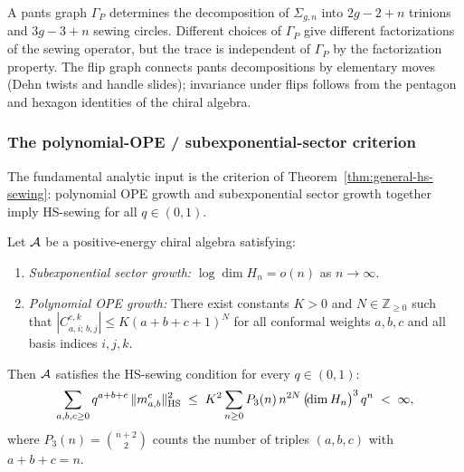 \begin{remark}
\label{rem:thqg-I-sewing-topology}
A pants graph $\Gamma_P$ determines the decomposition of $\Sigma_{g,n}$ into $2g - 2 + n$ trinions and $3g - 3 + n$ sewing circles. Different choices of $\Gamma_P$ give different factorizations of the sewing operator, but the trace is independent of $\Gamma_P$ by the factorization property. The flip graph connects pants decompositions by elementary moves (Dehn twists and handle slides); invariance under flips follows from the pentagon and hexagon identities of the chiral algebra.
\end{remark}

\subsubsection{The polynomial-OPE / subexponential-sector criterion}

The fundamental analytic input is the criterion of Theorem~\ref{thm:general-hs-sewing}: polynomial OPE growth and subexponential sector growth together imply HS-sewing for all $q \in (0,1)$.

\begin{theorem}
\label{thm:thqg-I-hs-sewing-criterion}
Let\/ $\mathcal{A}$ be a positive-energy chiral algebra satisfying:
\begin{enumerate}[label=\textup{(\alph*)}]
\item \emph{Subexponential sector growth:} $\log\dim H_n = o(n)$ as $n \to \infty$.
\item \emph{Polynomial OPE growth:} There exist constants $K > 0$ and $N \in \mathbb{Z}_{\geq 0}$ such that $|C^{c,k}_{a,i;\,b,j}| \leq K(a + b + c + 1)^N$ for all conformal weights $a,b,c$ and all basis indices $i,j,k$.
\end{enumerate}
Then $\mathcal{A}$ satisfies the HS-sewing condition for every $q \in (0,1)$:
\begin{equation}\label{eq:thqg-I-hs-criterion-bound}
\sum_{a,b,c \geq 0} q^{a+b+c}\,\|m^c_{a,b}\|_{\operatorname{HS}}^2 \;\leq\; K^2 \sum_{n \geq 0} P_3(n)\,n^{2N}\, \bigl(\!\dim H_n\bigr)^3\,q^n \;<\; \infty,
\end{equation}
where $P_3(n) = \binom{n+2}{2}$ counts the number of triples $(a,b,c)$ with $a + b + c = n$.
\end{theorem}

